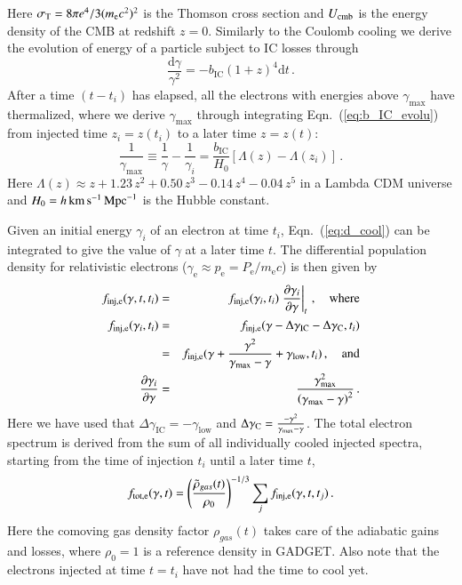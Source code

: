 \documentclass[useAMS,usenatbib]{mn2e}
\newcommand{\dd}{\mathrm{d}}
\newcommand{\e}{\mathrm{e}}
\newcommand{\IC}{\mathrm{IC}}
\newcommand{\ma}{\mathrm{max}}
\newcommand{\low}{\mathrm{low}}
\newcommand{\gam}{\gamma}
\begin{document}
Here $\sigma_\rmn{T}= 8\pi e^4/3(m_\e c^2)^2$ is the Thomson cross
section and $U_{\mathrm{cmb}}$ is the energy density of the CMB at redshift
$z=0$. Similarly to the Coulomb cooling we derive the evolution of energy 
of a particle subject to IC losses through
\begin{equation}
  \label{eq:b_IC_evolu}
\frac{\dd \gam}{\gam^2} = -b_\IC (1+z)^4\dd t\,.
\end{equation}
After a time $(t-t_i)$ has elapsed, all the electrons with
energies above $\gam_\ma$ have thermalized, where we derive $\gam_\ma$
through integrating Eqn.~(\ref{eq:b_IC_evolu}) from injected time
$z_i=z(t_i)$ to a later time $z=z(t)$:
\begin{equation}
  \label{eq:b_max}
   \frac{1}{\gam_\ma} \equiv \frac{1}{\gam} - \frac{1}{\gam_i} = 
   \frac{b_\IC}{H_0}\left[\Lambda(z)-\Lambda(z_i)\right]\,.
\end{equation}
Here $\Lambda(z) \approx z + 1.23\,z^2 + 0.50\,z^3 - 0.14\,z^4 -
0.04\,z^5$ in a Lambda CDM universe and
$H_0=h\,{\mathrm{km}}\,{\mathrm{s}}^{-1}\,{\mathrm{Mpc}}^{-1}$ is the Hubble constant.

Given an initial energy $\gam_i$ of an electron at time $t_i$,
Eqn.~(\ref{eq:d_cool}) can be integrated to give the value of $\gam$
at a later time $t$. The differential population density for
relativistic electrons ($\gam_\e \approx p_\e = P_\e/m_\e c$) is then
given by
\begin{eqnarray}
\label{eq:f_evolv}
f_\rmn{inj,e}(\gam,t,t_i) &=& f_\rmn{inj,e}(\gam_i,t_i)
\left.\frac{\partial\gam_i}{\partial\gam}\right|_t\,,\quad \rmn{where} \\
 f_\rmn{inj,e}(\gam_i,t_i) &=& 
f_\rmn{inj,e}(\gam-\Delta\gam_\IC-\Delta\gam_\rmn{C},t_i) \nonumber\\
&=& f_\rmn{inj,e}(\gam+\frac{\gam^2}{\gam_\ma-\gam}+\gam_\low,t_i)\,,\quad \rmn{and} \\
\frac{\partial\gam_i}{\partial\gam} &=& 
\frac{\gam_\ma^2}{\left(\gam_\ma-\gam\right)^2}\,.
\end{eqnarray}
Here we have used that $\Delta\gam_\IC=-\gam_\low$ and
$\Delta\gam_\rmn{C}=\frac{-\gam^2}{\gam_\ma-\gam}$. The total electron
spectrum is derived from the sum of all individually cooled injected
spectra, starting from the time of injection $t_i$ until a later time
$t$,
\begin{eqnarray}
\label{eq:f_sum}
f_\rmn{tot,e}(\gam,t) = \left(\frac{\tilde{\rho}_{gas}(t)}{\rho_0}\right)^{-1/3}\sum_j f_\rmn{inj,e}(\gam,t,t_j)\,.
\end{eqnarray}
Here the comoving gas density factor $\rho_{gas}(t)$ takes care of the
adiabatic gains and losses, where $\rho_0=1$ is a reference density in
GADGET. Also note that the electrons injected at time $t=t_i$ have not
had the time to cool yet. 
\end{document}
